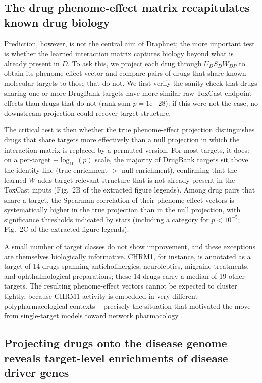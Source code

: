 \documentclass[11pt]{article}
\begin{document}
\subsection{The drug phenome-effect matrix recapitulates known drug
biology}

Prediction, however, is not the central aim of Draphnet; the more
important test is whether the learned interaction matrix captures
biology beyond what is already present in $D$. To ask this, we project
each drug through $U_D S_D W_{DP}$ to obtain its phenome-effect vector
and compare pairs of drugs that share known molecular targets to those
that do not. We first verify the sanity check that drugs sharing one or
more DrugBank targets have more similar raw ToxCast endpoint effects
than drugs that do not (rank-sum $p=1\mathrm{e}{-28}$): if this were
not the case, no downstream projection could recover target structure.

The critical test is then whether the true phenome-effect projection
distinguishes drugs that share targets more effectively than a null
projection in which the interaction matrix is replaced by a permuted
version. For most targets, it does: on a per-target $-\log_{10}(p)$
scale, the majority of DrugBank targets sit above the identity line
(true enrichment $>$ null enrichment), confirming that the learned $W$
adds target-relevant structure that is not already present in the
ToxCast inputs (Fig.~2B of the extracted figure legends). Among drug
pairs that share a target, the Spearman correlation of their
phenome-effect vectors is systematically higher in the true projection
than in the null projection, with significance thresholds indicated by
stars (including a category for $p<10^{-5}$; Fig.~2C of the extracted
figure legends).

A small number of target classes do not show improvement, and these
exceptions are themselves biologically informative. CHRM1, for
instance, is annotated as a target of 14 drugs spanning
anticholinergics, neuroleptics, migraine treatments, and ophthalmological
preparations; these 14 drugs carry a median of 19 other targets. The
resulting phenome-effect vectors cannot be expected to cluster
tightly, because CHRM1 activity is embedded in very different
polypharmacological contexts -- precisely the situation that motivated
the move from single-target models toward network pharmacology
\citep{hopkins2008network}.

\subsection{Projecting drugs onto the disease genome reveals target-level
enrichments of disease driver genes}
\end{document}
